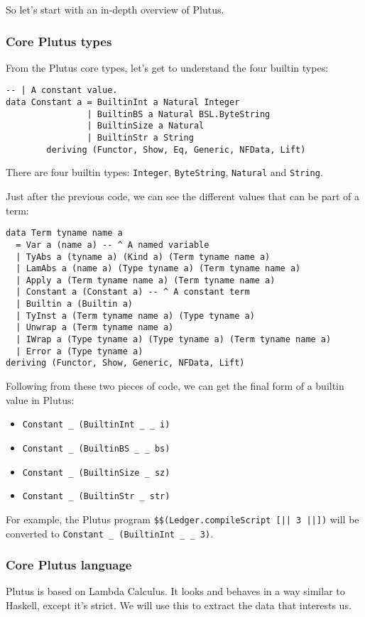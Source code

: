 \documentclass{article}
\begin{document}
So let's start with an in-depth overview of Plutus.

\subsubsection{Core Plutus types}
From the Plutus core types\cite{plutus-core-constant}, let's get to understand the four builtin types:
\nopagebreak
\begin{verbatim}
-- | A constant value.
data Constant a = BuiltinInt a Natural Integer
                | BuiltinBS a Natural BSL.ByteString
                | BuiltinSize a Natural
                | BuiltinStr a String
        deriving (Functor, Show, Eq, Generic, NFData, Lift)
\end{verbatim}

There are four builtin types: \verb|Integer|, \verb|ByteString|, \verb|Natural| and \verb|String|.

Just after the previous code\cite{plutus-core-term}, we can see the different values that can be part of a term:
\nopagebreak
\begin{verbatim}
data Term tyname name a
  = Var a (name a) -- ^ A named variable
  | TyAbs a (tyname a) (Kind a) (Term tyname name a)
  | LamAbs a (name a) (Type tyname a) (Term tyname name a)
  | Apply a (Term tyname name a) (Term tyname name a)
  | Constant a (Constant a) -- ^ A constant term
  | Builtin a (Builtin a)
  | TyInst a (Term tyname name a) (Type tyname a)
  | Unwrap a (Term tyname name a)
  | IWrap a (Type tyname a) (Type tyname a) (Term tyname name a)
  | Error a (Type tyname a)
deriving (Functor, Show, Generic, NFData, Lift)
\end{verbatim}

Following from these two pieces of code, we can get the final form of a builtin value in Plutus:
\nopagebreak
\begin{itemize}
\item \verb|Constant _ (BuiltinInt _ _ i)|
\item \verb|Constant _ (BuiltinBS _ _ bs)|
\item \verb|Constant _ (BuiltinSize _ sz)|
\item \verb|Constant _ (BuiltinStr _ str)|
\end{itemize}

For example, the Plutus program \verb#$$(Ledger.compileScript [|| 3 ||])#
will be converted to \verb#Constant _ (BuiltinInt _ _ 3)#.


\subsubsection{Core Plutus language}
Plutus is based on Lambda Calculus. It looks and behaves in a way similar to Haskell, except it's strict. We will use this to extract the data that interests us.
\end{document}
